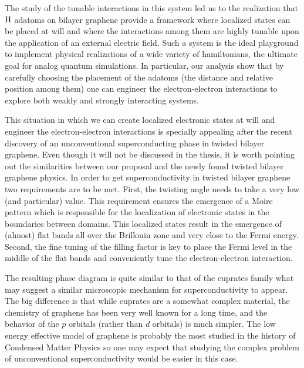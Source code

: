 The study of the tunable interactions in this system led us to the realization that $\ce{H}$ adatoms on bilayer graphene provide a framework where localized states can be placed at will and where the interactions among them are highly tunable upon the application of an external electric field.
Such a system is the ideal playground to implement physical realizations of a wide variety of hamiltonians, the ultimate goal for analog quantum simulations.
In particular, our analysis show that by carefully choosing the placement of the adatoms (the distance and relative position among them) one can engineer the electron-electron interactions to explore both weakly and strongly interacting systems.
\bigskip

This situation in which we can create localized electronic states at will and engineer the electron-electron interactions is specially appealing after the recent discovery of an unconventional superconducting phase in twisted bilayer graphene\cite{Cao2018,Cao2018a}.
Even though it will not be discussed in the thesis, it is worth pointing out the similarities between our proposal and the newly found twisted bilayer graphene physics.
In order to get superconductivity in twisted bilayer graphene two requirements are to be met. First, the twisting angle needs to take a very low (and particular) value. This requirement ensures the emergence of a Moire pattern which is responsible for the localization of electronic states in the boundaries between domains. This localized states result in the emergence of (almost) flat bands all over the Brillouin zone and very close to the Fermi energy. Second, the fine tuning of the filling factor is key to place the Fermi level in the middle of the flat bands and conveniently tune the electron-electron interaction.

The resulting phase diagram is quite similar to that of the cuprates family what may suggest a similar microscopic mechanism for superconductivity to appear. The big difference is that while cuprates are a somewhat complex material, the chemistry of graphene has been very well known for a long time, and the behavior of the $p$ orbitals (rather than $d$ orbitals) is much simpler.
The low energy effective model of graphene is probably the most studied in the history of Condensed Matter Physics so one may expect that studying the complex problem of unconventional superconductivity would be easier in this case.

